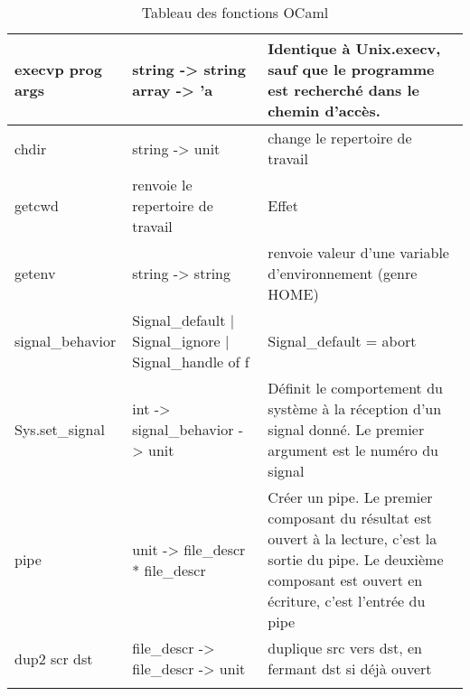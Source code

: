 \documentclass{article}
\begin{document}
\begin{longtable}{|p{4cm}|p{3cm}|p{7cm}|}
\hline 
execvp prog args & string -> string array -> 'a & Identique à Unix.execv, sauf que le programme est recherché dans le chemin d'accès. \\ 
\hline 
chdir & string -> unit & change le repertoire de travail \\ 
\hline 
getcwd & renvoie le repertoire de travail & Effet \\ 
\hline 
getenv & string -> string & renvoie valeur d'une variable d'environnement (genre HOME) \\ 
\hline 
signal\_behavior & Signal\_default | Signal\_ignore | Signal\_handle of f & Signal\_default = abort \\ 
\hline 
Sys.set\_signal & int -> signal\_behavior -> unit & Définit le comportement du système à la réception d'un signal donné. Le premier argument est le numéro du signal \\ 
\hline 
pipe & unit -> file\_descr * file\_descr & Créer un pipe. Le premier composant du résultat est ouvert à la lecture, c'est la sortie du pipe. Le deuxième composant est ouvert en écriture, c'est l'entrée du pipe \\ 
\hline 
dup2 scr dst & file\_descr -> file\_descr -> unit & duplique src vers dst, en fermant dst si déjà ouvert \\ 
\hline 
\caption{Tableau des fonctions OCaml}
\label{tab:tableau1} 
\end{longtable}
\end{document}
